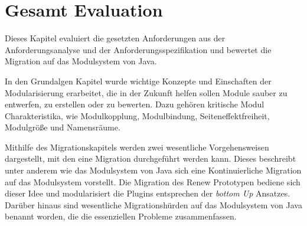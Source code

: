 \chapter{Gesamt Evaluation}
Dieses Kapitel evaluiert die gesetzten Anforderungen aus der Anforderungsanalyse und der Anforderungsspezifikation und bewertet die Migration auf das Modulsystem von Java.\bigbreak	

In den Grundalgen Kapitel wurde wichtige Konzepte und Einschaften der Modularisierung erarbeitet, die in der Zukunft helfen sollen Module sauber zu entwerfen, zu erstellen oder zu bewerten. Dazu gehören kritische Modul Charakteristika, wie Modulkopplung, Modulbindung, Seiteneﬀektfreiheit, Modulgröße und Namensräume. \bigbreak

Mithilfe des Migrationskapitels werden zwei wesentliche Vorgehensweisen dargestellt, mit den eine Migration durchgeführt werden kann. Dieses beschreibt unter anderem wie das Modulsystem von Java sich eine Kontinuierliche Migration auf das Modulsystem vorstellt. \newline
Die Migration des Renew Prototypen bediene sich dieser Idee und modularisiert die Plugins entsprechen der \textit{bottom Up} Ansatzes. Darüber hinaus sind wesentliche Migrationshürden auf das Modulsystem von Java benannt worden, die die essenziellen Probleme zusammenfassen. \bigbreak

 




%
%




% 







